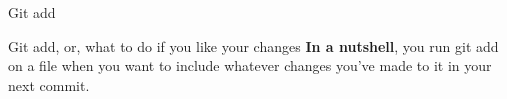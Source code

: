 \begin{frame}{Git add}
    \begin{block}{Git add, or, what to do if you like your changes}
    \textbf{In a nutshell}, you run git add on a file when you want to include whatever changes you've made to it in your next commit.
    
    \end{block}
\end{frame}
